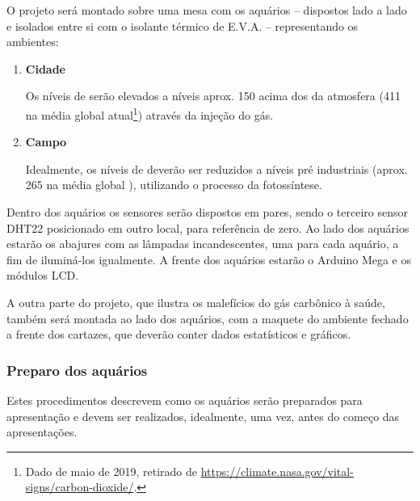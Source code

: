 \documentclass[article,11pt,oneside,a4paper,
	english,	%
	brazil,		%
	sumario=tradicional]{abntex2}
\begin{document}
O projeto será montado sobre uma mesa com os aquários -- dispostos lado a lado e isolados entre si com o isolante térmico de E.V.A. -- representando os ambientes:
\begin{enumerate}
	\item \textbf{Cidade}

	      Os níveis de  serão elevados a níveis aprox. \SI{150}{\ppm} acima dos da atmosfera (\SI{411}{\ppm} na média global atual\footnote{Dado de maio de 2019, retirado de \url{https://climate.nasa.gov/vital-signs/carbon-dioxide/}.}) através da injeção do gás.

	\item \textbf{Campo}

	      Idealmente, os níveis de  deverão ser reduzidos a níveis pré industriais (aprox. \SI{265}{\ppm} na média global \cite{Wigley1983}), utilizando o processo da fotossíntese.
\end{enumerate}

Dentro dos aquários os sensores serão dispostos em pares, sendo o terceiro sensor DHT22 posicionado em outro local, para referência de zero. Ao lado dos aquários estarão os abajures com as lâmpadas incandescentes, uma para cada aquário, a fim de iluminá-los igualmente. A frente dos aquários estarão o Arduino Mega e os módulos LCD.

A outra parte do projeto, que ilustra os malefícios do gás carbônico à saúde, também será montada ao lado dos aquários, com a maquete do ambiente fechado a frente dos cartazes, que deverão conter dados estatísticos e gráficos.


\subsubsection{Preparo dos aquários}

Estes procedimentos descrevem como os aquários serão preparados para apresentação e devem ser realizados, idealmente, uma vez, antes do começo das apresentações.
\end{document}
